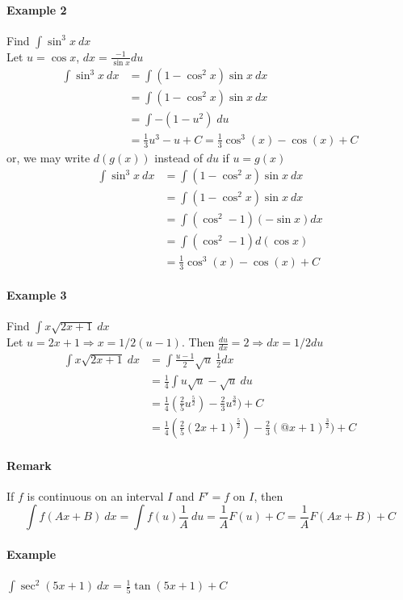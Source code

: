 \documentclass[12pt]{article}
\begin{document}
\paragraph{Example 2} Find $\int \sin^3 x\: dx$ \\
Let $u = \cos x$, $dx = \frac{-1}{\sin x} du$
\begin{align*} 
    \int \sin^3 x\: dx &= \int (1 - \cos^2 x)\sin x\: dx \\
    &= \int (1 - \cos^2 x)\sin x\: dx \\
    &= \int -(1 - u^2)\; du \\
    &= \frac{1}{3} u^3 - u + C = \frac{1}{3} \cos^3 (x) - \cos (x) + C
\end{align*}
or, we may write $d(g(x))$ instead of $du$ if $u = g(x)$
\begin{align*} 
    \int \sin^3 x\: dx &= \int (1 - \cos^2 x)\sin x\: dx \\
    &= \int (1 - \cos^2 x)\sin x\: dx \\
    &= \int (\cos^2 - 1)( - \sin x)dx\\
    &= \int (\cos^2 - 1) d(\cos x)\\
    &= \frac{1}{3} \cos^3 (x) - \cos (x) + C
\end{align*}
\paragraph{Example 3} Find $\int x \sqrt{2x + 1}\: dx$ \\
Let $u = 2x + 1 \Rightarrow x = 1/2 (u - 1)$. Then $\frac{du}{dx} = 2 \Rightarrow dx = 1/2 du$
\begin{align*} 
    \int x \sqrt{2x + 1}\: dx &= \int \frac{u - 1}{2} \sqrt{u}\: \frac{1}{2}dx \\
    &= \frac{1}{4} \int u\sqrt{u} - \sqrt{u}\: du \\
    &= \frac{1}{4} (\frac{2}{5} u^ \frac{5}{2}) - \frac{2}{3}u^{\frac{3}{2}}) + C \\
    &= \frac{1}{4} (\frac{2}{5} (2x + 1)^ \frac{5}{2}) - \frac{2}{3}(@x + 1)^{\frac{3}{2}}) + C
\end{align*}

\paragraph{Remark} If $f$ is continuous on an interval $I$ and $F' = f$ on $I$, then
\[
    \int f(Ax + B)\: dx = \int f(u) \frac{1}{A}\: du = \frac{1}{A} F(u) + C = \frac{1}{A} F(Ax + B) + C
\]
\paragraph{Example} $\int \sec^2 (5x + 1)\: dx$ = $\frac{1}{5} \tan (5x + 1) + C$
\end{document}
